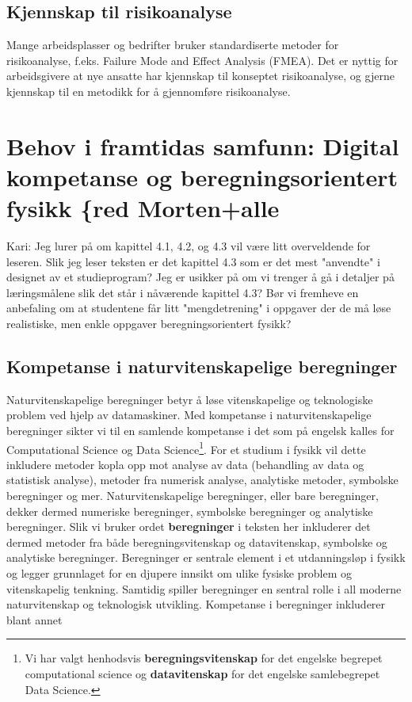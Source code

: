 \documentclass{article}
\begin{document}
\subsection{Kjennskap til risikoanalyse}
Mange arbeidsplasser og bedrifter bruker standardiserte metoder for risikoanalyse, f.eks. Failure Mode and Effect Analysis (FMEA). Det er nyttig for arbeidsgivere at nye ansatte har kjennskap til konseptet risikoanalyse, og gjerne kjennskap til en metodikk for å gjennomføre risikoanalyse.

\section{Behov i framtidas samfunn: Digital kompetanse og beregningsorientert fysikk {\color\{red} Morten+alle}
{\color{red} Kari: Jeg lurer på om kapittel 4.1, 4.2, og 4.3 vil være litt overveldende for leseren. Slik jeg leser teksten er det kapittel 4.3 som er det mest "anvendte" i designet av et studieprogram? Jeg er usikker på om vi trenger å gå i detaljer på læringsmålene slik det står i nåværende kapittel 4.3? Bør vi fremheve en anbefaling om at studentene får litt "mengdetrening" i oppgaver der de må løse realistiske, men enkle oppgaver beregningsorientert fysikk?}
\subsection{Kompetanse i naturvitenskapelige beregninger}

Naturvitenskapelige beregninger betyr å løse vitenskapelige og teknologiske problem ved hjelp av datamaskiner. 
Med kompetanse i naturvitenskapelige beregninger sikter vi til en samlende kompetanse i det som på engelsk kalles for Computational Science og Data Science\footnote{Vi har valgt henhodsvis {\bf beregningsvitenskap} for det engelske begrepet computational science og {\bf datavitenskap} for det engelske samlebegrepet Data Science.}. For et studium i fysikk vil dette inkludere metoder kopla opp mot analyse av data (behandling av data og statistisk analyse), metoder fra numerisk analyse, analytiske metoder, symbolske beregninger og mer. 
Naturvitenskapelige beregninger, eller bare beregninger, dekker dermed numeriske beregninger, symbolske beregninger og analytiske beregninger. Slik vi bruker ordet {\bf beregninger} i teksten her inkluderer det dermed metoder fra både beregningsvitenskap og datavitenskap, symbolske og analytiske beregninger.  Beregninger er sentrale element i et utdanningsløp i fysikk og legger grunnlaget for en djupere innsikt om ulike fysiske problem og vitenskapelig tenkning. Samtidig spiller beregninger en sentral rolle i all moderne naturvitenskap og teknologisk utvikling. 
Kompetanse i beregninger inkluderer blant annet
\end{document}

